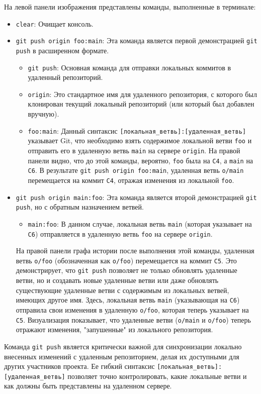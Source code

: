 \label{fig:lgb_push}

На левой панели изображения представлены команды, выполненные в терминале:
\begin{itemize}
    \item \texttt{clear}: Очищает консоль.
    \item \texttt{git push origin foo:main}: Эта команда является первой демонстрацией \texttt{git push} в расширенном формате.
    \begin{itemize}
        \item \texttt{git push}: Основная команда для отправки локальных коммитов в удаленный репозиторий.
        \item \texttt{origin}: Это стандартное имя для удаленного репозитория, с которого был клонирован текущий локальный репозиторий (или который был добавлен вручную).
        \item \texttt{foo:main}: Данный синтаксис \texttt{[локальная\_ветвь]:[удаленная\_ветвь]} указывает Git, что необходимо взять содержимое локальной ветви \texttt{foo} и отправить его в удаленную ветвь \texttt{main} на сервере \texttt{origin}.
        На правой панели видно, что до этой команды, вероятно, \texttt{foo} была на \texttt{C4}, а \texttt{main} на \texttt{C6}.
        В результате \texttt{git push origin foo:main}, удаленная ветвь \texttt{o/main} перемещается на коммит \texttt{C4}, отражая изменения из локальной \texttt{foo}.
    \end{itemize}
    \item \texttt{git push origin main:foo}: Эта команда является второй демонстрацией \texttt{git push}, но с обратным назначением ветвей.
    \begin{itemize}
        \item \texttt{main:foo}: В данном случае, локальная ветвь \texttt{main} (которая указывает на \texttt{C6}) отправляется в удаленную ветвь \texttt{foo} на сервере \texttt{origin}.
    \end{itemize}
    На правой панели графа истории после выполнения этой команды, удаленная ветвь \texttt{o/foo} (обозначенная как \texttt{o/foo}) перемещается на коммит \texttt{C5}.
    Это демонстрирует, что \texttt{git push} позволяет не только обновлять удаленные ветви, но и создавать новые удаленные ветви или даже обновлять существующие удаленные ветви с содержимым из локальных ветвей, имеющих другое имя.
    Здесь, локальная ветвь \texttt{main} (указывающая на \texttt{C6}) отправила свои изменения в удаленную \texttt{o/foo}, которая теперь указывает на \texttt{C5}.
    Визуализация показывает, что удаленные ветви (\texttt{o/main} и \texttt{o/foo}) теперь отражают изменения, "запушенные" из локального репозитория.
\end{itemize}
Команда \texttt{git push} является критически важной для синхронизации локально внесенных изменений с удаленным репозиторием, делая их доступными для других участников проекта.
Ее гибкий синтаксис \texttt{[локальная\_ветвь]:[удаленная\_ветвь]} позволяет точно контролировать, какие локальные ветви и как должны быть представлены на удаленном сервере.


